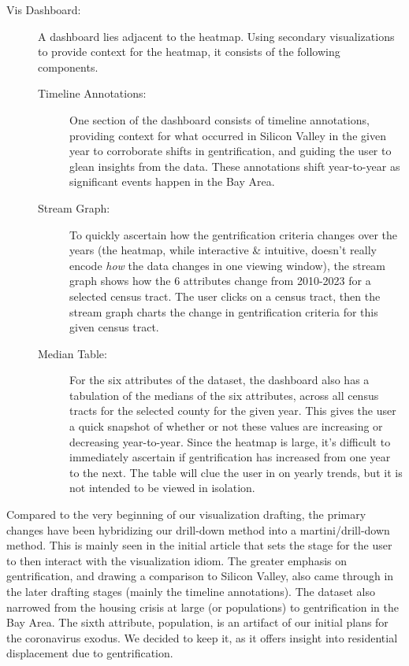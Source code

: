 \documentclass{article}
\begin{document}
\begin{description}
\begin{description}
        \item[Vis Dashboard:] A dashboard lies adjacent to the heatmap. Using secondary visualizations to provide context for the heatmap, it consists of the following components.
        
        \begin{description}
        
            \item[Timeline Annotations:] One section of the dashboard consists of timeline annotations, providing context for what occurred in Silicon Valley in the given year to corroborate shifts in gentrification, and guiding the user to glean insights from the data. These annotations shift year-to-year as significant events happen in the Bay Area.
            
            \item[Stream Graph:] To quickly ascertain how the gentrification criteria changes over the years (the heatmap, while interactive \& intuitive, doesn't really encode \textit{how} the data changes in one viewing window), the stream graph shows how the 6 attributes change from 2010-2023 for a selected census tract. The user clicks on a census tract, then the stream graph charts the change in gentrification criteria for this given census tract.
            
            \item[Median Table:] For the six attributes of the dataset, the dashboard also has a tabulation of the medians of the six attributes, across all census tracts for the selected county for the given year. This gives the user a quick snapshot of whether or not these values are increasing or decreasing year-to-year. Since the heatmap is large, it's difficult to immediately ascertain if gentrification has increased from one year to the next. The table will clue the user in on yearly trends, but it is not intended to be viewed in isolation. 
            
        \end{description}
        
    \end{description}
    
\end{description}

    Compared to the very beginning of our visualization drafting, the primary changes have been hybridizing our drill-down method into a martini/drill-down method. This is mainly seen in the initial article that sets the stage for the user to then interact with the visualization idiom. The greater emphasis on gentrification, and drawing a comparison to Silicon Valley, also came through in the later drafting stages (mainly the timeline annotations). The dataset also narrowed from the housing crisis at large (or populations) to gentrification in the Bay Area. The sixth attribute, population, is an artifact of our initial plans for the coronavirus exodus. We decided to keep it, as it offers insight into residential displacement due to gentrification. 
    
\end{document}
